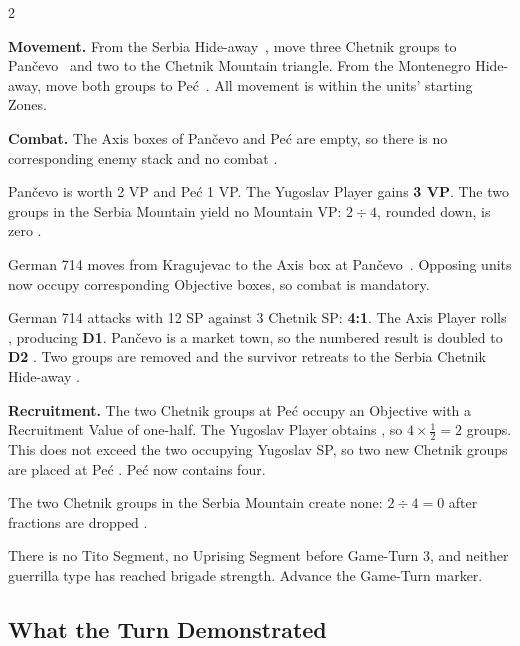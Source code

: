 \begin{multicols}{2}
\small
{}

\textbf{Movement.} From the Serbia Hide-away~, move three Chetnik
groups to Pančevo~ and two to the Chetnik Mountain triangle. From
the Montenegro Hide-away, move both groups to Peć~. All
movement is within the units' starting Zones.

\textbf{Combat.} The Axis boxes of Pančevo and Peć are empty, so there is
no corresponding enemy stack and no combat .


Pančevo is worth 2 VP and Peć 1 VP. The Yugoslav Player gains
\textbf{3 VP}. The two groups in the Serbia Mountain yield no Mountain VP:
$2 \div 4$, rounded down, is zero .


German 714 moves from Kragujevac to the Axis box at Pančevo~.
Opposing units now occupy corresponding Objective boxes, so combat is
mandatory.

\begin{commentarybox}[title={Combat calculation}]
German 714 attacks with 12 SP against 3 Chetnik SP: \textbf{4:1}. The Axis
Player rolls , producing \textbf{D1}. Pančevo is a market town, so the
numbered result is doubled to \textbf{D2} . Two groups are
removed and the survivor retreats to the Serbia Chetnik Hide-away
.
\end{commentarybox}

\columnbreak


\textbf{Recruitment.} The two Chetnik groups at Peć occupy an Objective
with a Recruitment Value of one-half. The Yugoslav Player obtains , so
$4 \times \tfrac{1}{2}=2$ groups. This does not exceed the two occupying
Yugoslav SP, so two new Chetnik groups are placed at Peć .
Peć now contains four.

The two Chetnik groups in the Serbia Mountain create none:
$2 \div 4=0$ after fractions are dropped .

There is no Tito Segment, no Uprising Segment before Game-Turn 3, and neither
guerrilla type has reached brigade strength. Advance the Game-Turn marker.

\subsection{What the Turn Demonstrated}


\end{multicols}
